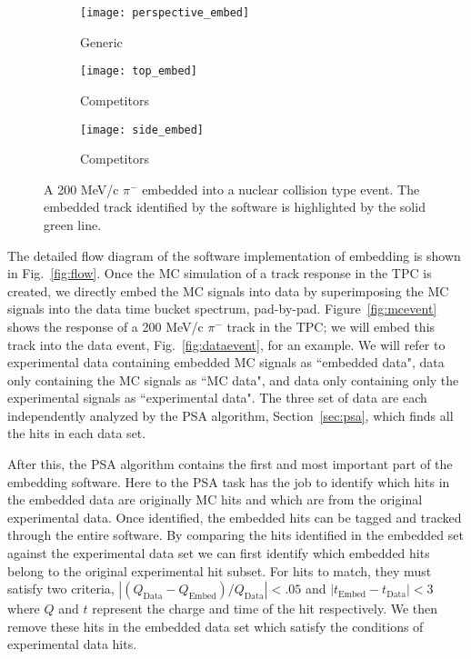 \begin{figure}[!htb]
    \centering
    \begin{subfigure}[t]{0.49\textwidth}
        \centering
        \texttt{[image: perspective\_embed]}
        \caption{Generic} \label{fig:persEmbed}
    \end{subfigure}
    \hfill
    \begin{subfigure}[t]{.3\textwidth}
        \centering
        \texttt{[image: top\_embed]} 
        \caption{Competitors} \label{fig:topEmbed}
    \end{subfigure}
     \hfill
    \begin{subfigure}[t]{\textwidth}
        \centering
        \texttt{[image: side\_embed]} 
        \caption{Competitors} \label{fig:sideEmbed}
    \end{subfigure}
    \caption{A 200 MeV/c $\pi^-$ embedded into a nuclear collision type event. The embedded track identified by the software is highlighted by the solid green line. }

\label{fig:embedtrack}
\end{figure}


The detailed flow diagram of the software implementation of embedding is shown in Fig.~\ref{fig:flow}. Once the MC simulation of a track response in the TPC is created, we directly embed the MC signals into data by superimposing the MC signals into the data time bucket spectrum, pad-by-pad. Figure~\ref{fig:mcevent} shows the response of a 200 MeV/c $\pi^-$ track in the TPC; we will embed this track into the data event, Fig.~\ref{fig:dataevent}, for an example. We will refer to experimental data containing embedded MC signals as ``embedded data", data only containing the MC signals as ``MC data", and data only containing only the experimental signals as ``experimental data". The three set of data are each independently analyzed by the PSA algorithm, Section~\ref{sec:psa},  which finds all the hits in each data set. 

After this, the PSA algorithm contains the first and most important part of the embedding software. Here to the PSA task has the job to identify which hits in the embedded data are originally MC hits and which are from the original experimental data. Once identified, the embedded hits can be tagged and tracked through the entire software. By comparing the hits identified in the embedded set against the experimental data set we can first identify which embedded hits belong to the original experimental hit subset. For hits to match, they must satisfy two criteria, $\left|(Q_{\mathrm{Data}} - Q_{\mathrm{Embed} })/Q_{\mathrm{Data}}\right| < .05$ and $\left|t_{\mathrm{Embed} } - t_{\mathrm{Data} }\right| < 3$ where $Q$ and $t$ represent the charge and time of the hit respectively. We then remove these hits in the embedded data set which satisfy the conditions of experimental data hits. 

